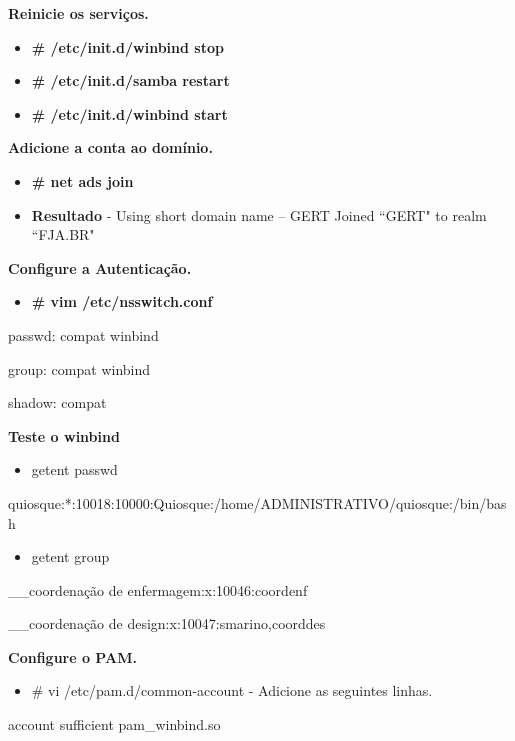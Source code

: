 \textbf{Reinicie os serviços.}

\begin{itemize}
	\item \textbf{\# /etc/init.d/winbind stop}
	\item \textbf{\# /etc/init.d/samba restart}
	\item \textbf{\# /etc/init.d/winbind start}
\end{itemize}

\textbf{Adicione a conta ao domínio.}

\begin{itemize}
	\item \textbf{\# net ads join}
	\item \textbf{Resultado} - Using short domain name – GERT Joined ``GERT" to realm ``FJA.BR"
\end{itemize}

\textbf{Configure a Autenticação.}

\begin{itemize}
	\item \textbf{\# vim /etc/nsswitch.conf}
\end{itemize}

	passwd:         compat winbind

	group:          compat winbind

	shadow:         compat

\textbf{Teste o winbind}

\begin{itemize}
	\item {getent passwd}
\end{itemize}

quiosque:*:10018:10000:Quiosque:/home/ADMINISTRATIVO/quiosque:/bin/bash

\begin{itemize}
	\item {getent group}
\end{itemize}

\_\_coordenação de enfermagem:x:10046:coordenf

\_\_coordenação de design:x:10047:smarino,coorddes

\textbf{Configure o PAM.}

\begin{itemize}
	\item {\# vi /etc/pam.d/common-account} - Adicione as seguintes linhas.
\end{itemize}

account sufficient       pam\_winbind.so

